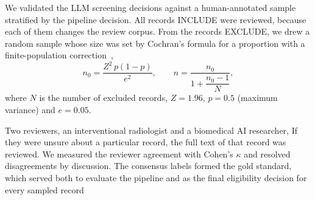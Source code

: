 We validated the LLM screening decisions against a human-annotated sample stratified by the pipeline decision. All records  INCLUDE were reviewed, because each of them changes the review corpus. From the records  EXCLUDE, we drew a random sample whose size was set by Cochran's formula for a proportion with a finite-population correction~\cite{cochran1977sampling},
\begin{equation}
n_0 = \frac{Z^2\,p(1-p)}{e^2}, \qquad n = \frac{n_0}{1 + \dfrac{n_0-1}{N}},
\end{equation}
where $N$ is the number of excluded records, $Z=1.96$, $p=0.5$ (maximum variance) and $e=0.05$.

Two reviewers, an interventional radiologist and a biomedical AI researcher,  If they were unsure about a particular record, the full text of that record was reviewed. We measured the reviewer agreement with Cohen's $\kappa$ and resolved disagreements by discussion. The consensus labels formed the gold standard, which served both to evaluate the pipeline and as the final eligibility decision for every sampled record



